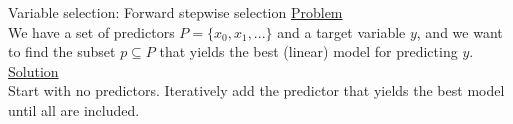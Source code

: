 \documentclass[8pt]{beamer}
\begin{document}
    \begin{frame}[t]{Variable selection: Forward stepwise selection} %
        \underline{Problem}\\
        We have a set of predictors $P=\{x_0, x_1, ...\}$ and a target variable $y$, and we want to find the subset $p \subseteq P$ that yields the best (linear) model for predicting $y$.\\
        \vspace{0.25cm}
        \underline{Solution}\\
        Start with no predictors. Iteratively add the predictor that yields the best model until all are included.\\
        \vspace{0.25cm}
        \centering

        \def\nodefont{\fontsize{4}{4}\linespread{0.85}\selectfont}
        \def\hsep{1.6}
        \def\vsep{0.75}
    \end{frame}
\end{document}
